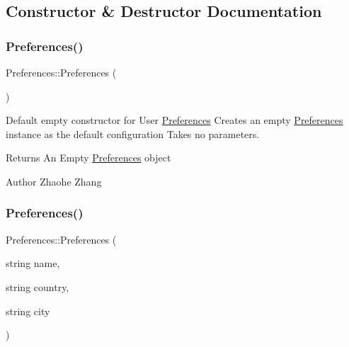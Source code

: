 \subsection{Constructor \& Destructor Documentation}
\mbox{\label{class_preferences_a9ca3b7029509bc36da1a57ed296c2fa8}} 
\subsubsection{\texorpdfstring{Preferences()}{Preferences()}\hspace{0.1cm}{\footnotesize\ttfamily [1/3]}}
{\footnotesize\ttfamily Preferences\+::\+Preferences (\begin{DoxyParamCaption}{ }\end{DoxyParamCaption})}



Default empty constructor for User \mbox{\hyperlink{class_preferences}{Preferences}}  Creates an empty \mbox{\hyperlink{class_preferences}{Preferences}} instance as the default configuration  Takes no parameters. 

\begin{DoxyReturn}{Returns}
An Empty \mbox{\hyperlink{class_preferences}{Preferences}} object 
\end{DoxyReturn}
\begin{DoxyAuthor}{Author}
Zhaohe Zhang 
\end{DoxyAuthor}
\mbox{\label{class_preferences_a419ad1e25778f1705cd8c15cd18fcdab}} 
\subsubsection{\texorpdfstring{Preferences()}{Preferences()}\hspace{0.1cm}{\footnotesize\ttfamily [2/3]}}
{\footnotesize\ttfamily Preferences\+::\+Preferences (\begin{DoxyParamCaption}\item[{string}]{name,  }\item[{string}]{country,  }\item[{string}]{city }\end{DoxyParamCaption})}



